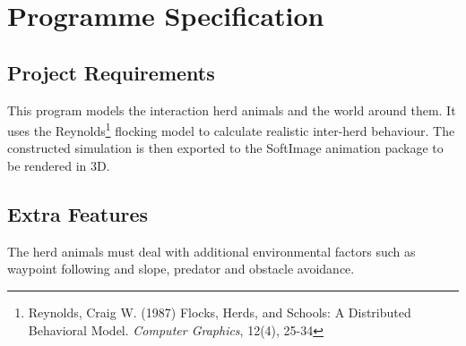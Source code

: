 \section{Programme Specification} \label{c:specification}

\subsection{Project Requirements}
This program models the interaction herd animals and the world around them. It uses the Reynolds\footnote[1]{Reynolds, Craig W. (1987) Flocks, Herds, and Schools: A Distributed Behavioral Model. \emph{Computer Graphics}, 12(4), 25-34} flocking model to calculate realistic inter-herd behaviour. The constructed simulation is then exported to the SoftImage animation package to be rendered in 3D.

\subsection{Extra Features}
The herd animals must deal with additional environmental factors such as waypoint following and slope, predator and obstacle avoidance. 